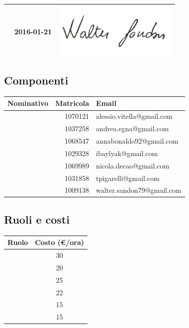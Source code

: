 \documentclass[12pt,a4paper]{article}
\begin{document}
\begin{table}[H]
\begin{center}
\begin{tabular}{l l l}
			\WS{} & 2016-01-21 & \includegraphics[width=6cm]{../img/firmaSandon.png} \\
			\bottomrule
		\end{tabular}
	\end{center}
\end{table}

\subsection{Componenti}

\begin{table}[H]
	\begin{center}
		\begin{tabular}{l r l}
			\toprule
            \textbf{Nominativo}	& \textbf{Matricola} & \textbf{Email} \\ \midrule
			\midrule
			\AVI{} & 1070121 & alessio.vitella@gmail.com \\ \midrule
			\AVE{} & 1037258 & andrea.egna@gmail.com \\ \midrule
			\AB{} & 1068547 & annabonaldo92@gmail.com \\ \midrule
			\IB{} & 1029328 & ibaylyak@gmail.com \\ \midrule
			\NDC{} & 1069989 & nicola.decao@gmail.com \\ \midrule
			\TP{}  & 1031858 & tpigarelli@gmail.com \\ \midrule
			\WS{} & 1009138 & walter.sandon79@gmail.com \\
			\bottomrule
		\end{tabular}
	\end{center}
\end{table}

\subsection{Ruoli e costi}\label{ruoli e costi}

\begin{table}[H]
	\begin{center}
		\begin{tabular}{l c}
			\toprule
            \textbf{Ruolo}	& \textbf{Costo (\euro/ora)} \\ \midrule
			\midrule
            \RE{} & 30 \\ \midrule
            \AM{} & 20 \\ \midrule
            \AN{} & 25 \\ \midrule
            \PG{} & 22 \\ \midrule
            \PR{} & 15 \\ \midrule
            \VR{} & 15 \\
			\bottomrule
		\end{tabular}
	\end{center}
\end{table}
\end{document}

